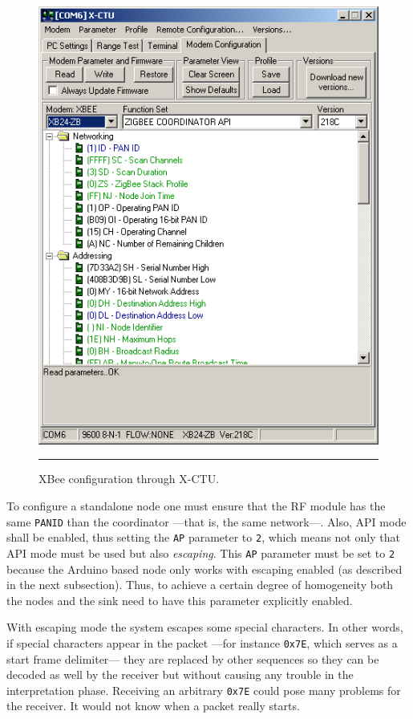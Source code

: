 \begin{figure}[htbp]
    \centering
        \includegraphics[scale=0.6]{./Figures/xctuw.png}
        \rule{35em}{0.5pt}
        \caption[XBee\textregistered{} configuration through X-CTU]{XBee\textregistered{} configuration through X-CTU.}
    \label{fig:xctuw}
\end{figure}

To configure a standalone node one must ensure that the RF module has the same \texttt{PANID} than the coordinator ---that is, the same network---. Also, API mode shall be enabled, thus setting the \texttt{AP} parameter to \texttt{2}, which means not only that API mode must be used but also \emph{escaping}. This \texttt{AP} parameter must be set to \texttt{2} because the Arduino based node only works with escaping enabled (as described in the next subsection). Thus, to achieve a certain degree of homogeneity both the nodes and the sink need to have this parameter explicitly enabled.

With escaping mode the system escapes some special characters. In other words, if special characters appear in the packet ---for instance \texttt{0x7E}, which serves as a start frame delimiter--- they are replaced by other sequences so they can be decoded as well by the receiver but without causing any trouble in the interpretation phase. Receiving an arbitrary \texttt{0x7E} could pose many problems for the receiver. It would not know when a packet really starts\cite{digi:escapedchars}.

